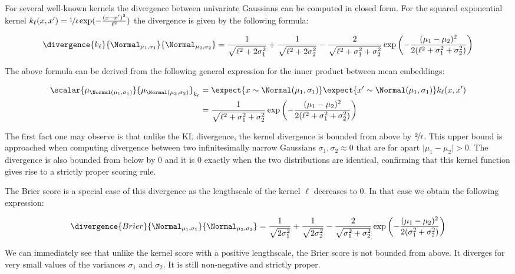 For several well-known kernels the divergence between univariate Gaussians can be computed in closed form.\citep{Song2008} For the squared exponential kernel $k_{\ell}(x,x')=\nicefrac{1}{\ell}\exp(-\frac{(x-x')^2}{\ell^2})$ the divergence is given by the following formula:

\begin{equation}
	\divergence{k_{\ell}}{\Normal_{\mu_1,\sigma_1}}{\Normal_{\mu_2,\sigma_2}} = \frac{1}{\sqrt{\ell^2+2\sigma_1^2}} + \frac{1}{\sqrt{\ell^2+2\sigma_2^2}} - \frac{2}{\sqrt{\ell^2+\sigma_1^2 + \sigma_2^2}}\exp\left(-\frac{(\mu_1 - \mu_2)^2}{2(\ell^2 + \sigma_1^2 + \sigma_2^2)}\right)
\end{equation}

The above formula can be derived from the following general expression for the inner product between mean embeddings:

\begin{align}
	\scalar{\mu_{\Normal(\mu_1,\sigma_1)}}{\mu_{\Normal(\mu_2,\sigma_2)}}_{k_{\ell}} &= \expect{x\sim \Normal(\mu_1,\sigma_1)}\expect{x' \sim \Normal(\mu_1,\sigma_1)} k_{\ell}(x,x')\\
	&= \frac{1}{\sqrt{\ell^2 + \sigma_1^2 + \sigma_2^2}}\exp\left(-\frac{(\mu_1 - \mu_2)^2}{2(\ell^2 + \sigma_1^2 + \sigma_2^2)}\right)
\end{align} 

The first fact one may observe is that unlike the KL divergence, the kernel divergence is bounded from above by $\nicefrac{2}{\ell}$. This upper bound is approached when computing divergence between two infinitesimally narrow Gaussians $\sigma_1,\sigma_2\approx 0$ that are far apart $\vert \mu_1 - \mu_2 \vert > 0$. The divergence is also bounded from below by $0$ and it is $0$ exactly when the two distributions are identical, confirming that this kernel function gives rise to a strictly proper scoring rule.

The Brier score is a special case of this divergence as the lengthscale of the kernel $\ell$ decreases to $0$. In that case we obtain the following expression:

\begin{equation}
	\divergence{Brier}{\Normal_{\mu_1,\sigma_1}}{\Normal_{\mu_2,\sigma_2}} = \frac{1}{\sqrt{2\sigma_1^2}} + \frac{1}{\sqrt{2\sigma_2^2}} - \frac{2}{\sqrt{\sigma_1^2 + \sigma_2^2}}\exp\left(-\frac{(\mu_1 - \mu_2)^2}{2(\sigma_1^2 + \sigma_2^2)}\right)
\end{equation}

We can immediately see that unlike the kernel score with a positive lengthscale, the Brier score is not bounded from above. It diverges for very small values of the variances $\sigma_1$ and $\sigma_2$. It is still non-negative and strictly proper.

